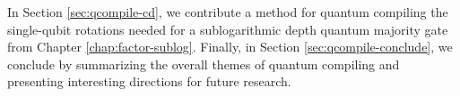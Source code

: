 In Section \ref{sec:qcompile-cd}, we contribute a method for
quantum compiling the single-qubit rotations needed for a
sublogarithmic depth quantum majority gate from Chapter \ref{chap:factor-sublog}.
Finally, in Section \ref{sec:qcompile-conclude}, we conclude by summarizing
the overall themes of quantum compiling and presenting interesting
directions for future research.

















